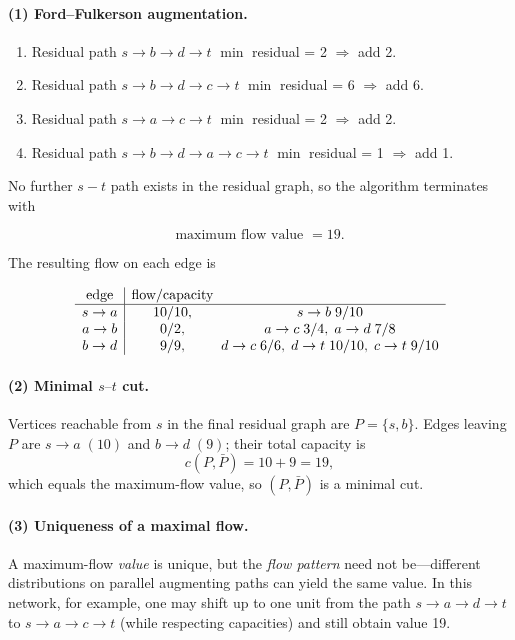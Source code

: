 \documentclass{article}
\theoremstyle{theorem}
\theoremstyle{definition}
\theoremstyle{remark}
\begin{document}
\paragraph{(1) Ford–Fulkerson augmentation.}
\begin{enumerate}[label=\arabic*. ,leftmargin=2.3em]
  \item Residual path \(s\!\to b\!\to d\!\to t\)  
        \(\min\) residual = 2  
        \(\Rightarrow\) add 2.
  \item Residual path \(s\!\to b\!\to d\!\to c\!\to t\)  
        \(\min\) residual = 6  
        \(\Rightarrow\) add 6.
  \item Residual path \(s\!\to a\!\to c\!\to t\)  
        \(\min\) residual = 2  
        \(\Rightarrow\) add 2.
  \item Residual path \(s\!\to b\!\to d\!\to a\!\to c\!\to t\)  
        \(\min\) residual = 1  
        \(\Rightarrow\) add 1.
\end{enumerate}

No further \(s\!-\!t\) path exists in the residual graph, so the algorithm
terminates with

\[
\boxed{\text{maximum flow value }=19}.
\]

The resulting flow on each edge is

\[
\begin{array}{c|c@{\;\;}c}
\text{edge} & \text{flow}/\text{capacity} & \\ \hline
s\to a & 10/10, & s\to b\; 9/10 \\
a\to b & 0/2,   & a\to c\; 3/4,\; a\to d\; 7/8 \\
b\to d & 9/9,   & d\to c\; 6/6,\; d\to t\; 10/10,\; c\to t\; 9/10
\end{array}
\]

\newpage

\paragraph{(2) Minimal \(s\text{–}t\) cut.}
Vertices reachable from \(s\) in the final residual graph are
\(P=\{s,b\}\).
Edges leaving \(P\) are \(s\to a\;(10)\) and \(b\to d\;(9)\);
their total capacity is
\[
c(P,\bar P)=10+9=19,
\]
which equals the maximum-flow value, so \((P,\bar P)\) is a minimal cut.

\paragraph{(3) Uniqueness of a maximal flow.}
A maximum-flow \emph{value} is unique, but the \emph{flow pattern} need not
be—different distributions on parallel augmenting paths can yield the same
value.  In this network, for example, one may shift up to one unit from the
path \(s\to a\to d\to t\) to \(s\to a\to c\to t\) (while respecting
capacities) and still obtain value 19.
\end{document}
